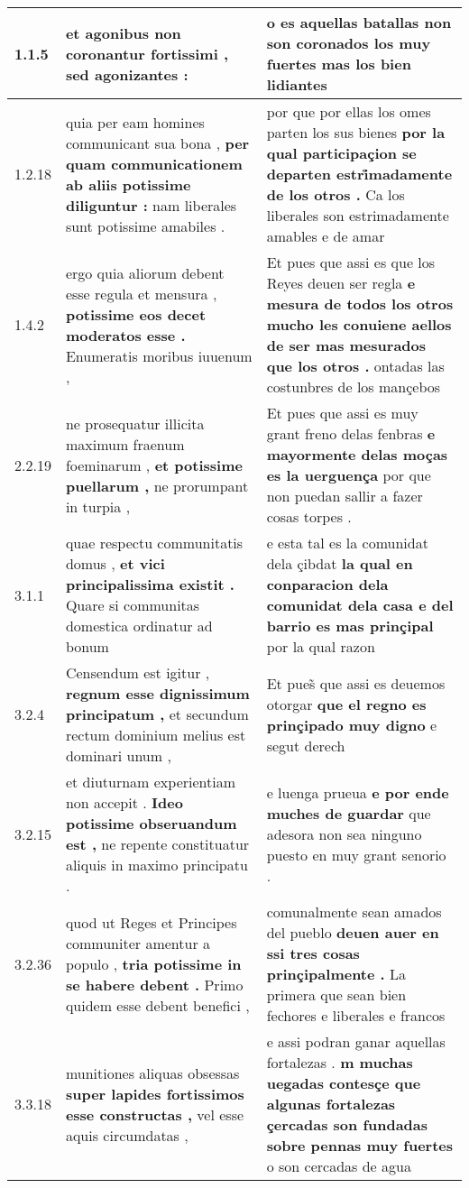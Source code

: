 \begin{tabular}{|p{1cm}|p{6.5cm}|p{6.5cm}|}

\hline
1.1.5 & et agonibus \textbf{ non coronantur fortissimi , } sed agonizantes : & o es aquellas batallas \textbf{ non son coronados los muy fuertes } mas los bien lidiantes \\\hline
1.2.18 & quia per eam homines communicant sua bona , \textbf{ per quam communicationem ab aliis potissime diliguntur : } nam liberales sunt potissime amabiles . & por que por ellas los omes parten los sus bienes \textbf{ por la qual participaçion se departen estri̊madamente de los otros . } Ca los liberales son estrimadamente amables e de amar \\\hline
1.4.2 & ergo quia aliorum debent esse regula et mensura , \textbf{ potissime eos decet moderatos esse . } Enumeratis moribus iuuenum , & Et pues que assi es que los Reyes deuen ser regla \textbf{ e mesura de todos los otros mucho les conuiene aellos de ser mas mesurados que los otros . } ontadas las costunbres de los mançebos \\\hline
2.2.19 & ne prosequatur illicita maximum fraenum foeminarum , \textbf{ et potissime puellarum , } ne prorumpant in turpia , & Et pues que assi es muy grant freno delas fenbras \textbf{ e mayormente delas moças es la uerguença } por que non puedan sallir a fazer cosas torpes . \\\hline
3.1.1 & quae respectu communitatis domus , \textbf{ et vici principalissima existit . } Quare si communitas domestica ordinatur ad bonum & e esta tal es la comunidat dela çibdat \textbf{ la qual en conparacion dela comunidat dela casa e del barrio es mas prinçipal } por la qual razon \\\hline
3.2.4 & Censendum est igitur , \textbf{ regnum esse dignissimum principatum , } et secundum rectum dominium melius est dominari unum , & Et pues̃ que assi es deuemos otorgar \textbf{ que el regno es prinçipado muy digno } e segut derech \\\hline
3.2.15 & et diuturnam experientiam non accepit . \textbf{ Ideo potissime obseruandum est , } ne repente constituatur aliquis in maximo principatu . & e luenga prueua \textbf{ e por ende muches de guardar } que adesora non sea ninguno puesto en muy grant senorio . \\\hline
3.2.36 & quod ut Reges et Principes communiter amentur a populo , \textbf{ tria potissime in se habere debent . } Primo quidem esse debent benefici , & comunalmente sean amados del pueblo \textbf{ deuen auer en ssi tres cosas prinçipalmente . } La primera que sean bien fechores e liberales e francos \\\hline
3.3.18 & munitiones aliquas obsessas \textbf{ super lapides fortissimos esse constructas , } vel esse aquis circumdatas , & e assi podran ganar aquellas fortalezas . \textbf{ m muchas uegadas contesçe que algunas fortalezas çercadas son fundadas sobre pennas muy fuertes } o son cercadas de agua \\\hline

\end{tabular}
